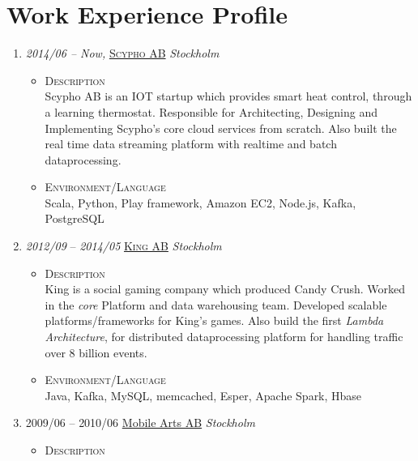 \documentclass[a4paper,10pt]{article}
\begin{document}
  \section{Work Experience Profile}
\begin{enumerate}  
\item \emph{2014/06 – Now,} \textsc{\href{www.scypho.com}{Scypho AB}} \emph {Stockholm} \\

  \begin{itemize}
    \item \textsc{Description} \\
      Scypho AB is an IOT startup which provides smart heat control, through a learning thermostat. Responsible for Architecting, Designing and Implementing Scypho's core cloud services from scratch.
      Also built the real time data streaming platform with realtime and batch dataprocessing.
   
  \item \textsc{Environment/Language} \\
    Scala, Python, Play framework, Amazon EC2, Node.js, Kafka, PostgreSQL

 \end{itemize}
   
\item \emph{2012/09} – \emph{2014/05} \textsc{\href{www.king.com}{King AB}} \emph{Stockholm} \\
  \begin{itemize}
    \item \textsc{Description} \\
  
      King is a social gaming company which produced Candy Crush. Worked in the \emph{core} Platform and data warehousing team. Developed scalable platforms/frameworks for King's games.
      Also build the first \emph {Lambda Architecture}, for distributed dataprocessing platform for handling traffic over 8 billion events.

     \item \textsc {Environment/Language} \\
       Java, Kafka, MySQL, memcached, Esper, Apache Spark, Hbase

   \end{itemize}
  
\item \textsc{2009/06} – \textsc{2010/06} \href{www.mobilearts.com}{Mobile Arts AB} \emph {Stockholm} \\
  \begin{itemize}
    \item \textsc{Description} \\
  

\end{itemize}
\end{enumerate}
\end{document}
